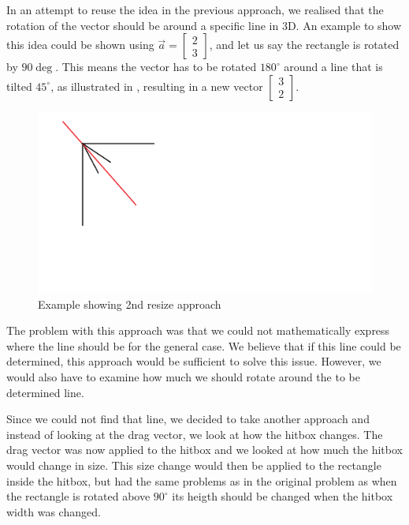 In an attempt to reuse the idea in the previous approach, we realised that the rotation of the vector should be around a specific line in 3D.
An example to show this idea could be shown using $\vec{a} =
\begin{bmatrix}
2 \\ 3
\end{bmatrix}$, and let us say the rectangle is rotated by $90\deg$.
This means the vector has to be rotated $180^\circ$ around a line that is tilted $45^\circ$, as illustrated in , resulting in a new vector 
$\begin{bmatrix}
3 \\ 2
\end{bmatrix}$.
\begin{figure}
\includegraphics[scale=0.5]{media/approach2}
\caption{Example showing 2nd resize approach}
\label{fig:app2}
\end{figure}
The problem with this approach was that we could not mathematically express where the line should be  for the general case.
We believe that if this line could be determined, this approach would be sufficient to solve this issue.
However, we would also have to examine how much we should rotate around the to be determined line.

Since we could not find that line, we decided to take another approach and instead of looking at the drag vector, we look at how the hitbox changes. 
The drag vector was now applied to the hitbox and we looked at how much the hitbox would change in size.
This size change would then be applied to the rectangle inside the hitbox, but had the same problems as in the original problem as when the rectangle is rotated above $90^\circ$ its heigth should be changed when the hitbox width was changed.


